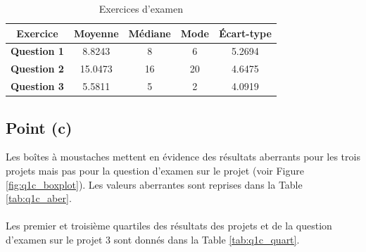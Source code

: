 \documentclass[a4paper,11pt]{article}
\begin{document}
\begin{table}[h]
	\center
	\begin{tabular}{|c|c|c|c|c|}
		\hline
		Exercice & \textbf{Moyenne} & \textbf{Médiane} & \textbf{Mode} & \textbf{Écart-type}\\
		\hline
		\textbf{Question 1} & 8.8243 & 8 & 6 & 5.2694\\
		\textbf{Question 2} & 15.0473 & 16 & 20 & 4.6475\\
		\textbf{Question 3} & 5.5811 & 5 & 2 & 4.0919\\
		\hline
	\end{tabular}
	\caption{Exercices d'examen}
	\label{tab:exer_exam}
\end{table}

\subsection{Point (c)}
Les boîtes à moustaches mettent en évidence des résultats aberrants pour les trois projets mais pas pour la question d'examen sur le projet (voir Figure \ref{fig:q1c_boxplot}). Les valeurs aberrantes sont reprises dans la Table \ref{tab:q1c_aber}.
\paragraph{}
Les premier et troisième quartiles des résultats des projets et de la question d'examen sur le projet 3 sont donnés dans la Table \ref{tab:q1c_quart}.
\end{document}
